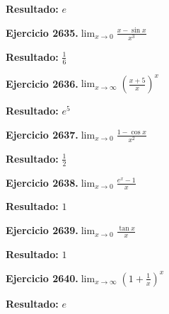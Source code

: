 \documentclass[10pt,a4paper]{article}
\begin{document}
\begin{solbox}
\textbf{Resultado:} \(\displaystyle e\)
\end{solbox}

\begin{ejbox}
\textbf{Ejercicio 2635.}\quad $\lim_{x\to 0} \frac{x-\sin x}{x^3}$
\end{ejbox}

\begin{solbox}
\textbf{Resultado:} \(\displaystyle \frac{1}{6}\)
\end{solbox}

\begin{ejbox}
\textbf{Ejercicio 2636.}\quad $\lim_{x\to \infty} \left(\frac{x+5}{x}\right)^{x}$
\end{ejbox}

\begin{solbox}
\textbf{Resultado:} \(\displaystyle e^{5}\)
\end{solbox}

\newpage
\begin{ejbox}
\textbf{Ejercicio 2637.}\quad $\lim_{x\to 0} \frac{1-\cos x}{x^2}$
\end{ejbox}

\begin{solbox}
\textbf{Resultado:} \(\displaystyle \frac{1}{2}\)
\end{solbox}

\begin{ejbox}
\textbf{Ejercicio 2638.}\quad $\lim_{x\to 0} \frac{e^x-1}{x}$
\end{ejbox}

\begin{solbox}
\textbf{Resultado:} \(\displaystyle 1\)
\end{solbox}

\begin{ejbox}
\textbf{Ejercicio 2639.}\quad $\lim_{x\to 0} \frac{\tan x}{x}$
\end{ejbox}

\begin{solbox}
\textbf{Resultado:} \(\displaystyle 1\)
\end{solbox}

\newpage
\begin{ejbox}
\textbf{Ejercicio 2640.}\quad $\lim_{x\to \infty} \left(1+\frac{1}{x}\right)^x$
\end{ejbox}

\begin{solbox}
\textbf{Resultado:} \(\displaystyle e\)
\end{solbox}
\end{document}
